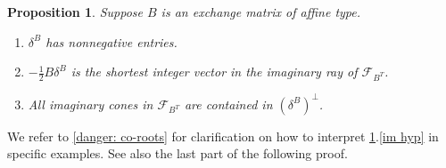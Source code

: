 \documentclass{amsart}
\newtheorem{proposition}{Proposition}[section]
\theoremstyle{definition}
\theoremstyle{remark}
\numberwithin{equation}{section}
\newcommand{\F}{{\mathcal F}}
\newcommand{\0}{{\mathbf{0}}}
\begin{document}
\begin{proposition}\label{delta is the man}
Suppose $B$ is an exchange matrix of affine type.
\begin{enumerate}[\quad\bf1.]
\item \label{im ray pos}
$\delta^B$ has nonnegative entries.
\item \label{im ray}
$-\frac12B\delta^B$ is the shortest integer vector in the imaginary ray of $\F_{B^T}$.
\item \label{im hyp}
All imaginary cones in $\F_{B^T}$ are contained in $(\delta^B)^\perp$.
\end{enumerate}
\end{proposition}

We refer to \cref{danger: co-roots} for clarification on how to interpret \cref{delta is the man}.\ref{im hyp} in specific examples.
See also the last part of the following proof.
\end{document}
